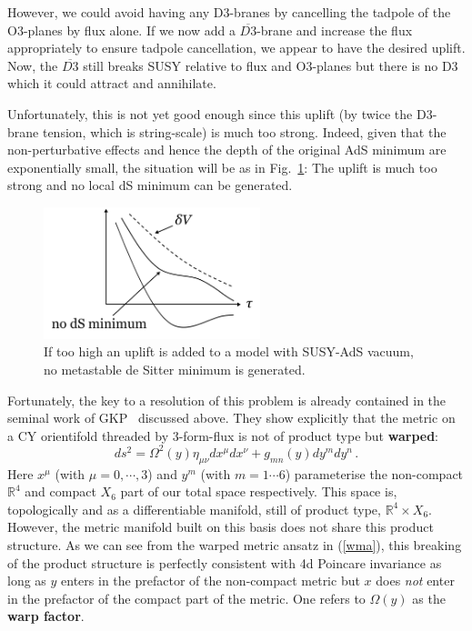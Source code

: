 \documentclass[12pt]{article}
\newcommand{\be}{\begin{equation}}
\newcommand{\ee}{\end{equation}}
\numberwithin{equation}{section}
\begin{document}
However, we could avoid having any D3-branes by cancelling the tadpole of the O3-planes by flux alone. If we now add a $\overline{D3}$-brane and increase the flux appropriately to ensure tadpole cancellation, we appear to have the desired uplift. Now, the $\overline{D3}$ still breaks SUSY relative to flux and O3-planes but there is no D3 which it could attract and annihilate. 

Unfortunately, this is not yet good enough since this uplift (by twice the D3-brane tension, which is string-scale) is much too strong. Indeed, given that the non-perturbative effects and hence the depth of the original AdS minimum are exponentially small, the situation will be as in Fig.~\ref{highup}: The uplift is much too strong and no local dS minimum can be generated. 

\begin{figure}[ht]
\begin{center} 
\includegraphics[width=6.3cm]{highup.png}
\caption{If too high an uplift is added to a model with SUSY-AdS vacuum, no metastable de Sitter minimum is generated.}
\label{highup} 
\end{center}
\end{figure}

Fortunately, the key to a resolution of this problem is already contained in the seminal work of GKP~\cite{Giddings:2001yu} discussed above. They show explicitly that the metric on a CY orientifold threaded by 3-form-flux is not of product type but {\bf warped}:
\be
ds^2=\Omega^2(y)\eta_{\mu\nu}dx^\mu dx^\nu + g_{mn}(y) dy^m dy^n\,. \label{wma}
\ee
Here $x^\mu$ (with $\mu=0,\cdots, 3$) and $y^m$ (with $m=1\cdots 6$) parameterise the non-compact $\mathbb{R}^4$ and compact $X_6$ part of our total space respectively. This space is, topologically and as a differentiable manifold, still of product type, $\mathbb{R}^4\times X_6$. However, the metric manifold built on this basis does not share this product structure. As we can see from the warped metric ansatz in (\ref{wma}), this breaking of the product structure is perfectly consistent with 4d Poincare invariance as long as $y$ enters in the prefactor of the non-compact metric but $x$ does {\it not} enter in the prefactor of the compact part of the metric. One refers to $\Omega(y)$ as the {\bf warp factor}.
\end{document}
